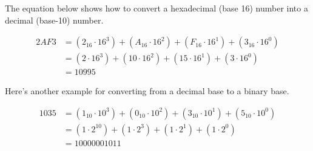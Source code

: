 The equation below shows how to convert a hexadecimal (base 16) number into a decimal (base-10) number. 

\begin{equation}
	\begin{split}
	2 A F 3 & = (2_{16} \cdot 16^{3}) + (A_{16} \cdot 16^{2}) + (F_{16} \cdot 16^{1}) + (3_{16} \cdot 16^{0}) \\
	& = (2 \cdot 16^{3}) + (10 \cdot 16^{2}) + (15 \cdot 16^{1}) + (3 \cdot 16^{0}) \\
	& = 10995
	\end{split}
\end{equation}

Here's another example for converting from a decimal base to a binary base.

\begin{equation}
	\begin{split}
	1035 & = (1_{10} \cdot 10^{3}) + (0_{10} \cdot 10^{2}) + (3_{10} \cdot 10^{1}) + (5_{10} \cdot 10^{0}) \\
	& = (1 \cdot 2^{10}) + (1 \cdot 2^{3}) + (1 \cdot 2^{1}) + (1 \cdot 2^{0}) \\
	& = 10000001011
	\end{split}
\end{equation}


